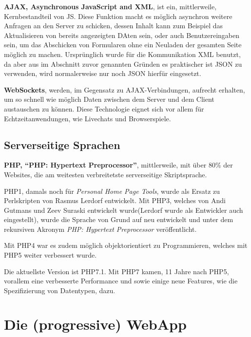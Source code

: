 \documentclass[a4paper,12pt,ngerman,listof=numbered]{scrartcl}      %
\let\oldcite\cite
\renewcommand{\cite}[1]{\textsuperscript{\oldcite{#1}}}
\newcommand{\spacer}{\par\bigskip\noindent}
\begin{document}
	\spacer\textbf{AJAX, Asynchronous JavaScript and XML}, ist ein, mittlerweile, Kernbestandteil von JS. Diese Funktion macht es möglich asynchron weitere Anfragen an den Server zu schicken, dessen Inhalt kann zum Beispiel das Aktualisieren von bereits angezeigten DAten sein, oder auch Benutzereingaben sein, um das Abschicken von Formularen ohne ein Neuladen der gesamten Seite möglich zu machen. Ursprünglich wurde für die Kommunikation XML benutzt, da aber aus im Abschnitt zuvor genannten Gründen es praktischer ist JSON zu verwenden, wird normalerweise nur noch JSON hierfür eingesetzt.\cite{ajaxWiki}\par
	
	\spacer\textbf{WebSockets}, werden, im Gegensatz zu AJAX-Verbindungen, aufrecht erhalten, um so schnell wie möglich Daten zwischen dem Server und dem Client austauschen zu können. Diese Technologie eignet sich vor allem für Echtzeitanwendungen, wie Livechats und Browserspiele.\cite{websocketWiki}\par
	
	\subsection{Serverseitige Sprachen}
	
	\spacer\textbf{PHP, ``PHP: Hypertext Preprocessor''}, mittlerweile, mit über 80\% der Websites, die am weitesten verbreitetste serverseitige Skriptsprache.\cite{phpCoverage}\par
	PHP1, damals noch für \emph{Personal Home Page Tools}, wurde als Ersatz zu Perlskripten von Rasmus Lerdorf entwickelt. Mit PHP3, welches von Andi Gutmans und Zeev Suraski entwickelt wurde(Lerdorf wurde als Entwickler auch eingestellt), wurde die Sprache von Grund auf neu entwickelt und unter dem rekursiven Akronym \emph{PHP: Hypertext Preprocessor} veröffentlicht.\par
	Mit PHP4 war es zudem möglich objektorientiert zu Programmieren, welches mit PHP5 weiter verbessert wurde.\par
	Die aktuellste Version ist PHP7.1. Mit PHP7 kamen, 11 Jahre nach PHP5, vorallem eine verbesserte Performance und sowie einige neue Features, wie die Spezifizierung von Datentypen, dazu.\cite{phpWiki}\par
	
	\section{Die (progressive) WebApp}
\end{document}
